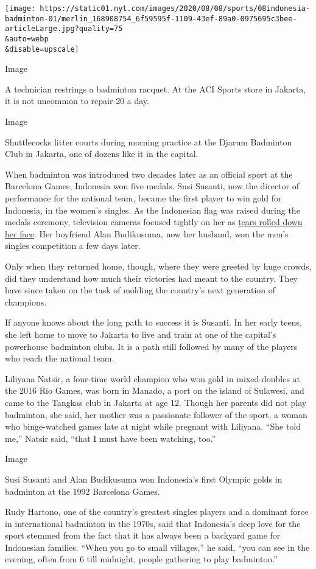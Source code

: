 \texttt{[image: https://static01.nyt.com/images/2020/08/08/sports/08indonesia-badminton-01/merlin\_168908754\_6f59595f-1109-43ef-89a0-0975695c3bee-articleLarge.jpg?quality=75\\\&auto=webp\\\&disable=upscale]}

Image

A technician restrings a badminton racquet. At the ACI Sports store in
Jakarta, it is not uncommon to repair 20 a day.

Image

Shuttlecocks litter courts during morning practice at the Djarum
Badminton Club in Jakarta, one of dozens like it in the capital.

When badminton was introduced two decades later as an official sport at
the Barcelona Games, Indonesia won five medals. Susi Susanti, now the
director of performance for the national team, became the first player
to win gold for Indonesia, in the women's singles. As the Indonesian
flag was raised during the medals ceremony, television cameras focused
tightly on her as \href{https://youtu.be/AeWa6qlGFas?t=42}{tears rolled
down her face}. Her boyfriend Alan Budikusuma, now her husband, won the
men's singles competition a few days later.

Only when they returned home, though, where they were greeted by huge
crowds, did they understand how much their victories had meant to the
country. They have since taken on the task of molding the country's next
generation of champions.

If anyone knows about the long path to success it is Susanti. In her
early teens, she left home to move to Jakarta to live and train at one
of the capital's powerhouse badminton clubs. It is a path still followed
by many of the players who reach the national team.

Liliyana Natsir, a four-time world champion who won gold in
mixed-doubles at the 2016 Rio Games, was born in Manado, a port on the
island of Sulawesi, and came to the Tangkas club in Jakarta at age 12.
Though her parents did not play badminton, she said, her mother was a
passionate follower of the sport, a woman who binge-watched games late
at night while pregnant with Liliyana. ``She told me,'' Natsir said,
``that I must have been watching, too.''

Image

Susi Susanti and Alan Budikusuma won Indonesia's first Olympic golds in
badminton at the 1992 Barcelona Games.

Rudy Hartono, one of the country's greatest singles players and a
dominant force in international badminton in the 1970s, said that
Indonesia's deep love for the sport stemmed from the fact that it has
always been a backyard game for Indonesian families. ``When you go to
small villages,'' he said, ``you can see in the evening, often from 6
till midnight, people gathering to play badminton.''

